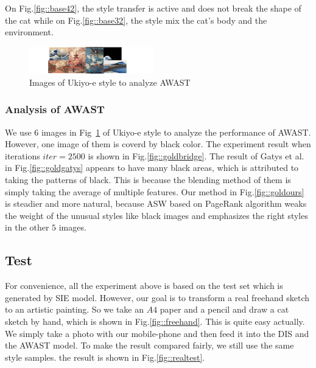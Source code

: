 \documentclass[10pt,twocolumn,letterpaper]{article}
\begin{document}
\FloatBarrier
On Fig.\ref{fig::base42}, the style transfer is active and does not break the shape of the cat while on Fig.\ref{fig::base32}, the style mix the cat's body and the environment.

\begin{figure}
    \includegraphics[width=0.48\textwidth]{figure/fshstyle.pdf}
    \caption{Images of Ukiyo-e style to analyze AWAST}
    \label{fig::fshstyle}
\end{figure}

\subsubsection{Analysis of AWAST}
We use $6$ images in Fig~\ref{fig::fshstyle} of Ukiyo-e style to analyze the performance of AWAST. However, one image of them is coverd by black color. The experiment result when iterations $iter=2500$ is shown in Fig.\ref{fig::goldbridge}. The result of Gatys et al. in Fig.\ref{fig::goldgatys} appears to have many black areas, which is attributed to taking the patterns of black. This is because the blending method of them is simply taking the average of multiple features. Our method in Fig.\ref{fig::goldours} is steadier and more natural, because ASW based on PageRank algorithm weaks the weight of the unusual styles like black images and emphasizes the right styles in the other $5$ images.

\subsection{Test}
For convenience, all the experiment above is based on the test set which is generated by SIE model. However, our goal is to transform a real freehand sketch to an artistic painting. So we take an $A4$ paper and a pencil and draw a cat sketch by hand, which is shown in Fig.\ref{fig::freehand}. This is quite easy actually. We simply take a photo with our mobile-phone and then feed it into the DIS and the AWAST model. To make the result compared fairly, we still use the same style samples. the result is shown in Fig.\ref{fig::realtest}.
\end{document}
